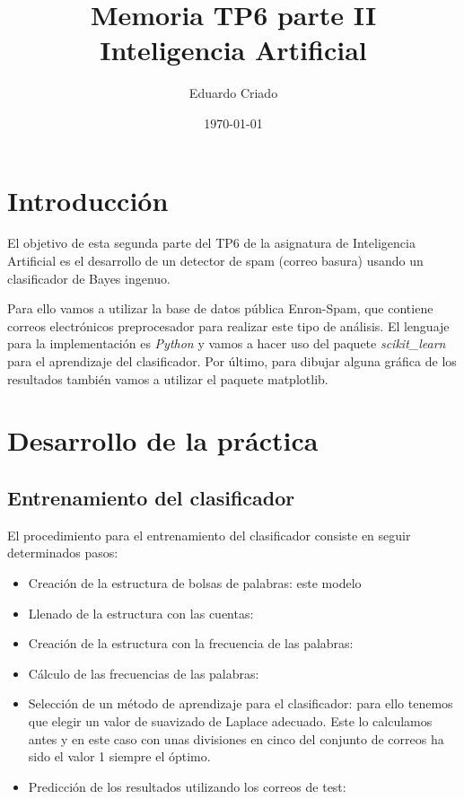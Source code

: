 \documentclass[12pt]{article}
\begin{document}
\title{Memoria TP6 parte II \\ Inteligencia Artificial}
\author{
        Eduardo Criado}
\date{\today}

\maketitle

\section{Introducci\'on}
El objetivo de esta segunda parte del TP6 de la asignatura de Inteligencia
Artificial es el desarrollo de un detector de spam (correo basura) usando
un clasificador de Bayes ingenuo.

Para ello vamos a utilizar la base de datos p\'ublica Enron-Spam, que contiene
correos electr\'onicos preprocesador para realizar este tipo de an\'alisis.
El lenguaje para la implementaci\'on es \textit{Python} y vamos a hacer uso del
paquete \textit{scikit\_learn} para el aprendizaje del clasificador.
Por \'ultimo, para dibujar alguna gr\'afica de los resultados tambi\'en vamos
a utilizar el paquete matplotlib.

\section{Desarrollo de la pr\'actica}

\subsection{Entrenamiento del clasificador}
El procedimiento para el entrenamiento del clasificador consiste en seguir
determinados pasos:
\begin{itemize}
	\item Creaci\'on de la estructura de bolsas de palabras: este modelo
	\item Llenado de la estructura con las cuentas:
	\item Creaci\'on de la estructura con la frecuencia de las palabras:
	\item C\'alculo de las frecuencias de las palabras:
	\item Selecci\'on de un m\'etodo de aprendizaje para el clasificador:
	para ello tenemos que elegir un valor de suavizado de Laplace adecuado.
	Este lo calculamos antes y en este caso con unas divisiones en cinco del
	conjunto de correos ha sido el valor 1 siempre el \'optimo.
	\item Predicci\'on de los resultados utilizando los correos de test:
\end{itemize}
\end{document}
